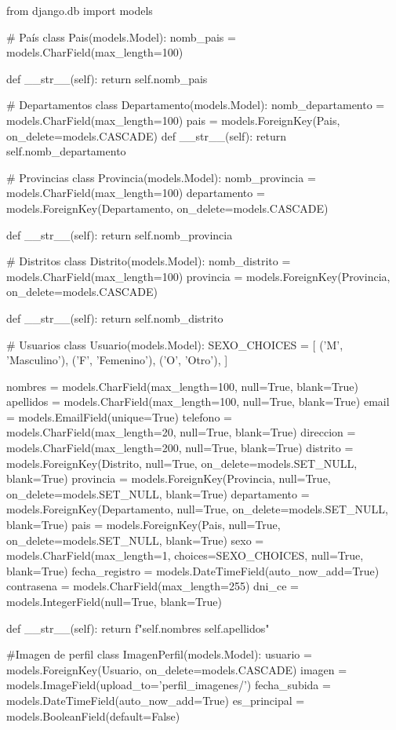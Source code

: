 from django.db import models

# País
class Pais(models.Model):
    nomb_pais = models.CharField(max_length=100)

    def __str__(self):
        return self.nomb_pais

# Departamentos
class Departamento(models.Model):
    nomb_departamento = models.CharField(max_length=100)
    pais = models.ForeignKey(Pais, on_delete=models.CASCADE)
    def __str__(self):
        return self.nomb_departamento
    
# Provincias
class Provincia(models.Model):
    nomb_provincia = models.CharField(max_length=100)
    departamento = models.ForeignKey(Departamento, on_delete=models.CASCADE)

    def __str__(self):
        return self.nomb_provincia

# Distritos
class Distrito(models.Model):
    nomb_distrito = models.CharField(max_length=100)
    provincia = models.ForeignKey(Provincia, on_delete=models.CASCADE)

    def __str__(self):
        return self.nomb_distrito

# Usuarios
class Usuario(models.Model):
    SEXO_CHOICES = [
        ('M', 'Masculino'),
        ('F', 'Femenino'),
        ('O', 'Otro'),
    ]
    
    nombres = models.CharField(max_length=100, null=True, blank=True)
    apellidos = models.CharField(max_length=100, null=True, blank=True)
    email = models.EmailField(unique=True)
    telefono = models.CharField(max_length=20, null=True, blank=True)
    direccion = models.CharField(max_length=200, null=True, blank=True)
    distrito = models.ForeignKey(Distrito, null=True, on_delete=models.SET_NULL, blank=True)
    provincia = models.ForeignKey(Provincia, null=True, on_delete=models.SET_NULL, blank=True)
    departamento = models.ForeignKey(Departamento, null=True, on_delete=models.SET_NULL, blank=True)
    pais = models.ForeignKey(Pais, null=True, on_delete=models.SET_NULL, blank=True)
    sexo = models.CharField(max_length=1, choices=SEXO_CHOICES, null=True, blank=True)
    fecha_registro = models.DateTimeField(auto_now_add=True)
    contrasena = models.CharField(max_length=255)
    dni_ce = models.IntegerField(null=True, blank=True)

    def __str__(self):
        return f"{self.nombres} {self.apellidos}"

#Imagen de perfil
class ImagenPerfil(models.Model):
    usuario = models.ForeignKey(Usuario, on_delete=models.CASCADE)
    imagen = models.ImageField(upload_to='perfil_imagenes/')
    fecha_subida = models.DateTimeField(auto_now_add=True)
    es_principal = models.BooleanField(default=False)


